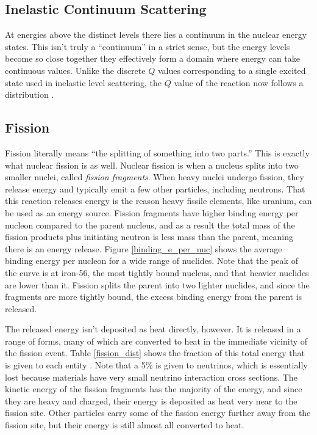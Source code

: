 \subsection{Inelastic Continuum Scattering}

At energies above the distinct levels there lies a continuum in the nuclear energy states.  This isn't truly a ``continuum'' in a strict sense, but the energy levels become so close together they effectively form a domain where energy can take continuous values.  Unlike the discrete $Q$ values corresponding to a single excited state used in inelastic level scattering, the $Q$ value of the reaction now follows a distribution \cite{krane}.  

\subsection{Fission}

Fission literally means ``the splitting of something into two parts.''  This is exactly what nuclear fission is as well.  Nuclear fission is when a nucleus splits into two smaller nuclei, called \emph{fission fragments}.  When heavy nuclei undergo fission, they release energy and typically emit a few other particles, including neutrons.  That this reaction releases energy is the reason heavy fissile elements, like uranium, can be used as an energy source.  Fission fragments have higher binding energy per nucleon compared to the parent nucleus, and as a result the total mass of the fission products plus initiating neutron is less mass than the parent, meaning there is an energy release.  Figure \ref{binding_e_per_nuc} shows the average binding energy per nucleon for a wide range of nuclides.  Note that the peak of the curve is at iron-56, the most tightly bound nucleus, and that heavier nuclides are lower than it.  Fission splits the parent into two lighter nuclides, and since the fragments are more tightly bound, the excess binding energy from the parent is released.  

The released energy isn't deposited as heat directly, however.  It is released in a range of forms, many of which are converted to heat in the immediate vicinity of the fission event.   Table \ref{fission_dist} shows the fraction of this total energy that is given to each entity \cite{duderstadt}.  Note that a 5\% is given to neutrinos, which is essentially lost because materials have very small neutrino interaction cross sections.  The kinetic energy of the fission fragments has the majority of the energy, and since they are heavy and charged, their energy is deposited as heat very near to the fission site.  Other particles carry some of the fission energy further away from the fission site, but their energy is still almost all converted to heat.  
  
